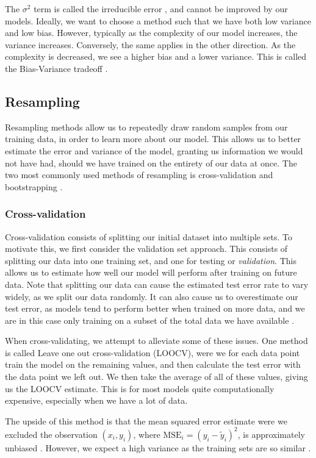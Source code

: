 \documentclass{article}
\begin{document}
The $\sigma^2$ term is called the irreducible error \cite[p.~223]{Hastie2009}, and cannot be improved by our models. Ideally, we want to choose a method such that we have both low variance and low bias. However, typically as the complexity of our model increases, the variance increases. Conversely, the same applies in the other direction. As the complexity is decreased, we see a higher bias and a lower variance. This is called the Bias-Variance tradeoff \cite[p.~223]{Hastie2009}.
 

\subsection{Resampling}
Resampling methods allow us to repeatedly draw random samples from our training data, in order to learn more about our model. This allows us to better estimate the error and variance of the model, granting us information we would not have had, should we have trained on the entirety of our data at once. The two most commonly used methods of resampling is cross-validation and bootstrapping \cite[p.~197]{james2021introduction}.

\subsubsection{Cross-validation}
Cross-validation consists of splitting our initial dataset into multiple sets. To motivate this, we first consider the validation set approach. This consists of splitting our data into one training set, and one for testing or \textit{validation}. This allows us to estimate how well our model will perform after training on future data. Note that splitting our data can cause the estimated test error rate to vary widely, as we split our data randomly. It can also cause us to overestimate our test error, as models tend to perform better when trained on more data, and we are in this case only training on a subset of the total data we have available \cite[p.~198--200]{james2021introduction}.

When cross-validating, we attempt to alleviate some of these issues. One method is called Leave one out cross-validation (LOOCV), were we for each data point train the model on the remaining values, and then calculate the test error with the data point we left out. We then take the average of all of these values, giving us the LOOCV estimate. This is for most models quite computationally expensive, especially when we have a lot of data.

The upside of this method is that the mean squared error estimate were we excluded the observation $(x_i, y_i)$, where $\text{MSE}_i = (y_i - \tilde{y}_i)^2$, is approximately unbiased \cite[p.~201]{james2021introduction}. However, we expect a high variance as the training sets are so similar \cite[p.~242]{Hastie2009}.
\end{document}
